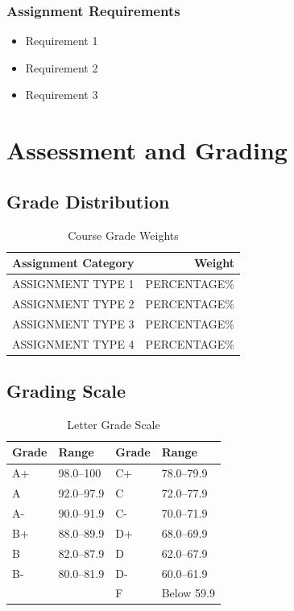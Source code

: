 \documentclass[11pt]{scrartcl} %
\begin{document}
\subsubsection{Assignment Requirements}
\begin{itemize}
\item Requirement 1
\item Requirement 2
\item Requirement 3
\end{itemize}


\section{Assessment and Grading}

\subsection{Grade Distribution}
\begin{table}[ht]
\caption{Course Grade Weights}
\centering
\begin{tabular}{>{\raggedright}p{}r}
\toprule
\textbf{Assignment Category} & \textbf{Weight} \\
\midrule
ASSIGNMENT TYPE 1 & PERCENTAGE\% \\
ASSIGNMENT TYPE 2 & PERCENTAGE\% \\
ASSIGNMENT TYPE 3 & PERCENTAGE\% \\
ASSIGNMENT TYPE 4 & PERCENTAGE\% \\
\bottomrule
\end{tabular}
\label{tab:grade-weights}
\end{table}

\subsection{Grading Scale}
\begin{table}[ht]
\caption{Letter Grade Scale}
\centering
\begin{tabular}{llll}
\toprule
\textbf{Grade} & \textbf{Range} & \textbf{Grade} & \textbf{Range} \\
\midrule
A+ & 98.0--100   & C+ & 78.0--79.9 \\
A  & 92.0--97.9  & C  & 72.0--77.9 \\
A- & 90.0--91.9  & C- & 70.0--71.9 \\
B+ & 88.0--89.9  & D+ & 68.0--69.9 \\
B  & 82.0--87.9  & D  & 62.0--67.9 \\
B- & 80.0--81.9  & D- & 60.0--61.9 \\
   &             & F  & Below 59.9 \\
\bottomrule
\end{tabular}
\label{tab:grading-scale}
\end{table}
\end{document}
